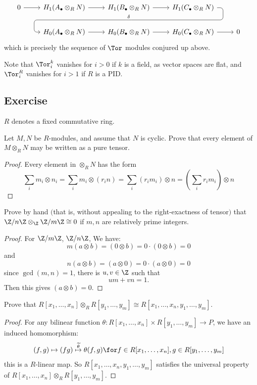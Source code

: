 \[\begin{tikzcd}
0\ar[r]&H_1(A_{\bullet}\otimes_{R}N)\ar[r] &H_1(B_{\bullet}\otimes_{R}N)\rar
\ar[draw=none]{d}[name=X, anchor=center]{}
&H_1(C_{\bullet}\otimes_{R}N)\ar[rounded corners,swap,
to path={ -- ([xshift=2ex]\tikztostart.east)
	|- (X.center) \tikztonodes
	-| ([xshift=-2ex]\tikztotarget.west)
	-- (\tikztotarget)}]{dll}[at end]{\delta}&\\      
&H_0(A_{\bullet}\otimes_{R}N)\rar &H_0(B_{\bullet}\otimes_{R}N)\rar &H_0(C_{\bullet}\otimes_{R}N)\ar[r]&0
\end{tikzcd}\]
which is precisely the sequence of $\Tor$ modules conjured up above.\par
Note that $\Tor^k_i$ vanishes for $i>0$ if $k$ is a field, as vector spaces are flat, and $\Tor^R_i$ vanishes for $i>1$ if $R$ is a PID.
\subsection{Exercise}
$R$ denotes a fixed commutative ring.
\begin{exercise}
Let $M,N$ be $R$-modules, and assume that $N$ is cyclic. Prove that every element of $M\otimes_{R}N$ may be written as a pure tensor.
\end{exercise}
\begin{proof}
Every element in $\otimes_{R}N$ has the form
\[\sum_im_i\otimes n_i=\sum_im_i\otimes(r_in)=\sum_i(r_im_i)\otimes n=(\sum_i r_im_i)\otimes n\]
\end{proof}
\begin{exercise}
Prove by hand $($that is, without appealing to the right-exactness of tensor$)$ that $\Z/n\Z\otimes_{\Z}\Z/m\Z\cong0$ if $m,n$ are relatively prime integers.
\end{exercise}
\begin{proof}
For $\Z/m\Z$, $\Z/n\Z$, We have:
\[m(a\otimes b)=(0\otimes b)=0\cdot(0\otimes b)=0\]
and 
\[n(a\otimes b)=(a\otimes 0)=0\cdot(a\otimes 0)=0\]
since $\gcd(m,n)=1$, there is $u,v\in\Z$ such that 
\[um+vn=1.\]
Then this gives $(a\otimes b)=0$.
\end{proof}
\begin{exercise}
Prove that $R[x_1,\dots,x_n]\otimes_{R}R[y_1,\dots,y_m]\cong R[x_1,\dots,x_n,y_1,\dots,y_m]$.
\end{exercise}
\begin{proof}
For any bilinear function $\theta:R[x_1,\dots,x_n]\times R[y_1,\dots,y_m]\to P$, we have an induced homomorphism:
\[(f,g)\mapsto(fg)\stackrel{\widetilde{\theta}}{\mapsto}\theta(f,g)\for f\in R[x_1,\dots,x_n], g\in R[y_1,\dots,y_m]\]
this is a $R$-linear map. So $R[x_1,\dots,x_n,y_1,\dots,y_m]$ satisfies the universal property of $R[x_1,\dots,x_n]\otimes_{R}R[y_1,\dots,y_m]$.
\end{proof}
